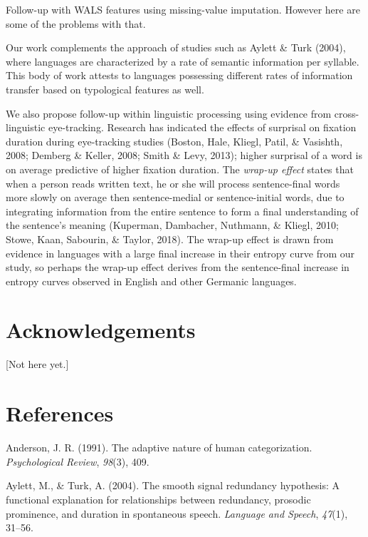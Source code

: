 \documentclass[10pt, letterpaper]{article}
\begin{document}
Follow-up with WALS features using missing-value imputation. However
here are some of the problems with that.

Our work complements the approach of studies such as Aylett \& Turk
(2004), where languages are characterized by a rate of semantic
information per syllable. This body of work attests to languages
possessing different rates of information transfer based on typological
features as well.

We also propose follow-up within linguistic processing using evidence
from cross-linguistic eye-tracking. Research has indicated the effects
of surprisal on fixation duration during eye-tracking studies (Boston,
Hale, Kliegl, Patil, \& Vasishth, 2008; Demberg \& Keller, 2008; Smith
\& Levy, 2013); higher surprisal of a word is on average predictive of
higher fixation duration. The \emph{wrap-up effect} states that when a
person reads written text, he or she will process sentence-final words
more slowly on average then sentence-medial or sentence-initial words,
due to integrating information from the entire sentence to form a final
understanding of the sentence's meaning (Kuperman, Dambacher, Nuthmann,
\& Kliegl, 2010; Stowe, Kaan, Sabourin, \& Taylor, 2018). The wrap-up
effect is drawn from evidence in languages with a large final increase
in their entropy curve from our study, so perhaps the wrap-up effect
derives from the sentence-final increase in entropy curves observed in
English and other Germanic languages.

\section{Acknowledgements}\label{acknowledgements}

{[}Not here yet.{]}

\section{References}\label{references}

\setlength{\parindent}{-0.1in} \setlength{\leftskip}{0.125in} \noindent

\hypertarget{refs}{}
\hypertarget{ref-anderson1991}{}
Anderson, J. R. (1991). The adaptive nature of human categorization.
\emph{Psychological Review}, \emph{98}(3), 409.

\hypertarget{ref-aylett2004}{}
Aylett, M., \& Turk, A. (2004). The smooth signal redundancy hypothesis:
A functional explanation for relationships between redundancy, prosodic
prominence, and duration in spontaneous speech. \emph{Language and
Speech}, \emph{47}(1), 31--56.
\end{document}
